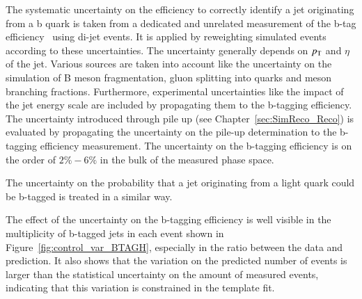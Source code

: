 The systematic uncertainty on the efficiency to correctly identify a jet originating from a b quark is taken from a dedicated and unrelated measurement of the b-tag efficiency~\cite{BTV16002} using di-jet events. It is applied by reweighting simulated events according to these uncertainties. The uncertainty generally depends on $p_{\mathrm{T}}$ and $\eta$ of the jet.
Various sources are taken into account like the uncertainty on the simulation of B meson fragmentation, gluon splitting into quarks and meson branching fractions.
Furthermore, experimental uncertainties like the impact of the jet energy scale are included by propagating them to the b-tagging efficiency. The uncertainty introduced through pile up (see Chapter~\ref{sec:SimReco_Reco}) is evaluated by propagating the uncertainty
on the pile-up determination to the b-tagging efficiency measurement.
The uncertainty on the b-tagging efficiency is on the order of $2\% - 6\%$ in the bulk of the measured phase space.

The uncertainty on the probability that a jet originating from a light quark could be b-tagged is treated in a similar way.

The effect of the uncertainty on the b-tagging efficiency is well visible in the multiplicity of b-tagged jets in each event shown in Figure~\ref{fig:control_var_BTAGH}, especially in the ratio between the data and prediction.
It also shows that the variation on the predicted number of events is larger than the statistical uncertainty on the amount of measured events, indicating that this variation is constrained in the
template fit.

